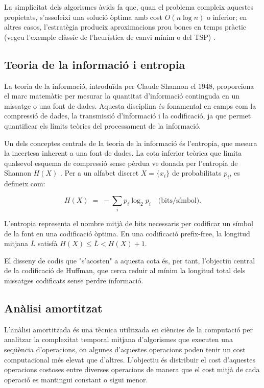 \documentclass{ieeetj}
\begin{document}
La simplicitat dels algorismes àvids fa que, quan el problema compleix aquestes propietats, s’assoleixi una solució òptima amb cost $O(n \log n)$ o inferior; en altres casos, l’estratègia produeix aproximacions prou bones en temps pràctic (vegeu l’exemple clàssic de l’heurística de canvi mínim o del TSP) \cite{kaplan2013}.

\subsection{Teoria de la informació i entropia}\label{subsec:entropy}
La teoria de la informació, introduïda per Claude Shannon\cite{shannon1948} el 1948, proporciona el marc matemàtic per mesurar la quantitat d'informació continguda en un missatge o una font de dades. Aquesta disciplina és fonamental en camps com la compressió de dades, la transmissió d'informació i la codificació, ja que permet quantificar els límits teòrics del processament de la informació.\newline

 Un dels conceptes centrals de la teoria de la informació és l'entropia\cite{entropia}, que mesura la incertesa inherent a una font de dades. La cota inferior teòrica que limita qualsevol esquema de compressió sense pèrdua ve donada per l’entropia de Shannon $H(X)$ \cite{shannon1948}. Per a un alfabet discret $X=\{x_i\}$ de probabilitats $p_i$, es defineix com:



\[
H(X) \;=\; -\sum_{i} p_i \log_2 p_i \quad\text{(bits/símbol)}.
\]



L'entropia representa el nombre mitjà de bits necessaris per codificar un símbol de la font en una codificació òptima. En una codificació prefix-free, la longitud mitjana $\bar L$ satisfà $H(X) \le \bar L < H(X)+1$. 

El disseny de codis que "s'acosten" a aquesta cota és, per tant, l'objectiu central de la codificació de Huffman, que cerca reduir al mínim la longitud total dels missatges codificats sense perdre informació.



\subsection{Anàlisi amortitzat
}
L'anàlisi amortitzada\cite{amortized} és una tècnica utilitzada en ciències de la computació per analitzar la complexitat temporal mitjana d'algorismes que executen una seqüència d'operacions, on algunes d'aquestes operacions poden tenir un cost computacional més elevat que d'altres. 
L'objectiu és distribuir el cost d'aquestes operacions costoses entre diverses operacions de manera que el cost mitjà de cada operació es mantingui constant o sigui menor.
\end{document}

